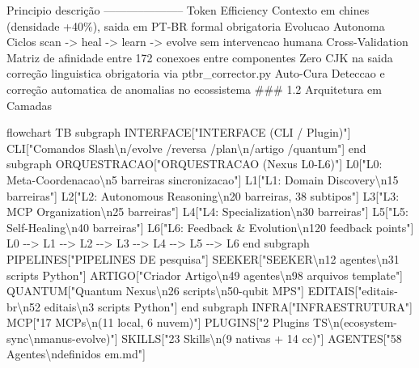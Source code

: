 \documentclass[
  12pt,
]{article}
\newenvironment{Shaded}{}{}
\newcommand{\NormalTok}[1]{#1}
\begin{document}
Principio \textbar{} descrição \textbar{}
\textbar-----------\textbar-----------\textbar{} \textbar{} Token
Efficiency \textbar{} Contexto em chines (densidade +40\%), saida em
PT-BR formal obrigatoria \textbar{} \textbar{} Evolucao Autonoma
\textbar{} Ciclos scan -\textgreater{} heal -\textgreater{} learn
-\textgreater{} evolve sem intervencao humana \textbar{} \textbar{}
Cross-Validation \textbar{} Matriz de afinidade entre 172 conexoes entre
componentes \textbar{} \textbar{} Zero CJK na saida \textbar{} correção
linguistica obrigatoria via ptbr\_corrector.py \textbar{} \textbar{}
Auto-Cura \textbar{} Deteccao e correção automatica de anomalias no
ecossistema \textbar{} \#\#\# 1.2 Arquitetura em Camadas

\begin{Shaded}
\begin{Highlighting}[]
\NormalTok{flowchart TB}
\NormalTok{subgraph INTERFACE["INTERFACE (CLI / Plugin)"]}
\NormalTok{CLI["Comandos Slash\textbackslash{}n/evolve /reversa /plan\textbackslash{}n/artigo /quantum"]}
\NormalTok{end}
\NormalTok{subgraph ORQUESTRACAO["ORQUESTRACAO (Nexus L0{-}L6)"]}
\NormalTok{L0["L0: Meta{-}Coordenacao\textbackslash{}n5 barreiras sincronizacao"]}
\NormalTok{L1["L1: Domain Discovery\textbackslash{}n15 barreiras"]}
\NormalTok{L2["L2: Autonomous Reasoning\textbackslash{}n20 barreiras, 38 subtipos"]}
\NormalTok{L3["L3: MCP Organization\textbackslash{}n25 barreiras"]}
\NormalTok{L4["L4: Specialization\textbackslash{}n30 barreiras"]}
\NormalTok{L5["L5: Self{-}Healing\textbackslash{}n40 barreiras"]}
\NormalTok{L6["L6: Feedback \& Evolution\textbackslash{}n120 feedback points"]}
\NormalTok{L0 {-}{-}\textgreater{} L1 {-}{-}\textgreater{} L2 {-}{-}\textgreater{} L3 {-}{-}\textgreater{} L4 {-}{-}\textgreater{} L5 {-}{-}\textgreater{} L6}
\NormalTok{end}
\NormalTok{subgraph PIPELINES["PIPELINES DE pesquisa"]}
\NormalTok{SEEKER["SEEKER\textbackslash{}n12 agentes\textbackslash{}n31 scripts Python"]}
\NormalTok{ARTIGO["Criador Artigo\textbackslash{}n49 agentes\textbackslash{}n98 arquivos template"]}
\NormalTok{QUANTUM["Quantum Nexus\textbackslash{}n26 scripts\textbackslash{}n50{-}qubit MPS"]}
\NormalTok{EDITAIS["editais{-}br\textbackslash{}n52 editais\textbackslash{}n3 scripts Python"]}
\NormalTok{end}
\NormalTok{subgraph INFRA["INFRAESTRUTURA"]}
\NormalTok{MCP["17 MCPs\textbackslash{}n(11 local, 6 nuvem)"]}
\NormalTok{PLUGINS["2 Plugins TS\textbackslash{}n(ecosystem{-}sync\textbackslash{}nmanus{-}evolve)"]}
\NormalTok{SKILLS["23 Skills\textbackslash{}n(9 nativas + 14 cc)"]}
\NormalTok{AGENTES["58 Agentes\textbackslash{}ndefinidos em.md"]}

\end{Highlighting}
\end{Shaded}
\end{document}
